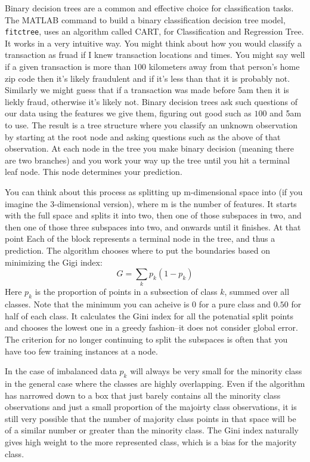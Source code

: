 \documentclass{article}
\begin{document}
Binary decision trees are a common and effective choice for classification tasks.
The MATLAB command to build a binary classification decision tree model, \texttt{fitctree}, uses an algorithm called CART, for Classification and Regression Tree.
It works in a very intuitive way. You might think about how you would classify a transaction as fruad if I knew transaction locations and times. You might say well if a given transaction is more than $100$ kilometers away from that person's home zip code then it's likely fraudulent and if it's less than that it is probably not. Similarly we might guess that if a transaction was made before 5am then it is liekly fraud, otherwise it's likely not. Binary decision trees ask such questions of our data using the features we give them, figuring out good  such as $100$ and 5am to use. The result is a tree structure where you classify an unknown observation by starting at the root node and asking questions such as the above of that observation.
At each node in the tree you make binary decision (meaning there are two branches) and you work your way up the tree until you hit a terminal leaf node. This node determines your prediction.

You can think about this process as splitting up m-dimensional space into  (if you imagine the 3-dimensional version), where m is the number of features. It starts with the full space and splits it into two, then one of those subspaces in two, and then one of those three subspaces into two, and onwards until it finishes.
At that point Each of the block represents a terminal node in the tree, and thus a prediction.
The algorithm chooses where to put the boundaries based on minimizing the Gigi index:
\begin{equation}
G={\textstyle \sum_{k}p_{k}(1-p_{k})}
\end{equation}
Here $p_k$ is the proportion of points in a subsection of class $k$, summed over all classes.
Note that the minimum you can acheive is 0 for a pure class and $0.50$ for half of each class. It calculates the Gini index for all the potenatial split points and chooses the lowest one in a greedy fashion--it does not consider global error. The criterion for no longer continuing to split the subspaces is often that you have too few training instances at a node.

In the case of imbalanced data $p_k$ will always be very small for the minority class in the general case where the classes are highly overlapping. Even if the algorithm has narrowed down to a box that just barely contains all the minority class observations and just a small proportion of the majoirty class observations, it is still very possible that the number of majority class points in that space will be of a similar number or greater than the minority class. The Gini index naturally gives high weight to the more represented class, which is a bias for the majority class.
\end{document}

